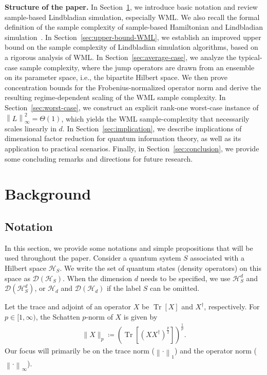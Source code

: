 \documentclass[superscriptaddress,amsmath,amssymb,aps,pra,letterpaper,tightenlines,notitlepages,12pt]{revtex4-2}
\begin{document}
\noindent
\textbf{Structure of the paper.}
In Section~\ref{sec:background}, we introduce basic notation and review sample-based Lindbladian simulation, especially WML. We also recall the formal definition of the sample complexity of sample-based Hamiltonian and Lindbladian simulation~\cite[Definition~1]{go2025SamplebasedHamiltonianLindbladian}.  In Section~\ref{sec:upper-bound-WML}, we establish an improved upper bound on the sample complexity of Lindbladian simulation algorithms, based on a rigorous analysis of WML. In Section~\ref{sec:average-case}, we analyze the typical-case sample complexity, where the jump operators are drawn from an ensemble on its parameter space, i.e., the bipartite Hilbert space. We then prove concentration bounds for the Frobenius-normalized operator norm and derive the resulting regime-dependent scaling of the WML sample complexity. In Section~\ref{sec:worst-case}, we construct an explicit rank-one worst-case instance of $\left\|L\right\|_\infty^2=\Theta(1)$, which yields the WML sample-complexity that necessarily scales linearly in $d$. In Section~\ref{sec:implication}, we describe implications of dimensional factor reduction for quantum information theory, as well as its application to practical scenarios. Finally, in Section~\ref{sec:conclusion}, we provide some concluding remarks and directions for future research.


\section{Background}

\label{sec:background}

\subsection{Notation}
In this section, we provide some notations and simple propositions that will be used throughout the paper. Consider a quantum system $S$ associated with a Hilbert space $\mathcal{H}_{S}$. We write the set of quantum states (density operators) on this space as $\mathcal{D}(\mathcal{H}_{S})$. When the dimension $d$ needs to be specified, we use $\mathcal{H}^{d}_S$ and $\mathcal{D}(\mathcal{H}^{d}_S)$, or $\mathcal{H}_d$ and $\mathcal{D}(\mathcal{H}_d)$ if the label $S$ can be omitted.

Let the trace and adjoint of an operator $X$ be $\operatorname{Tr}[X]$ and $X^{\dag}$, respectively. For $p \in [1,\infty)$, the Schatten $p$-norm of $X$ is given by
\begin{align}\label{eq:schatten-norm}
    \|X\|_{p} \coloneqq \left( \operatorname{Tr}\!\left[\left(XX^{\dag}\right)^{\frac{p}{2}} \right]\right)^{\frac{1}{p}}.
\end{align}
Our focus will primarily be on the trace norm ($\left\| \cdot \right\|_{1}$) and the operator norm ($\left\| \cdot \right\|_{\infty}$).
\end{document}
